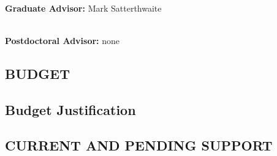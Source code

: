 \documentclass[12pt]{article}
\begin{document}
\ \\
\noindent
{\bf Graduate Advisor:} Mark Satterthwaite

\ \\
\noindent
{\bf Postdoctoral Advisor:} none

\newpage
\begin{center}
\section{BUDGET}
\end{center}
\newpage
\addtocounter{page}{3}
\subsection{Budget Justification}

\newpage
\begin{center}
\section{CURRENT AND PENDING SUPPORT}
\end{center}
\end{document}
